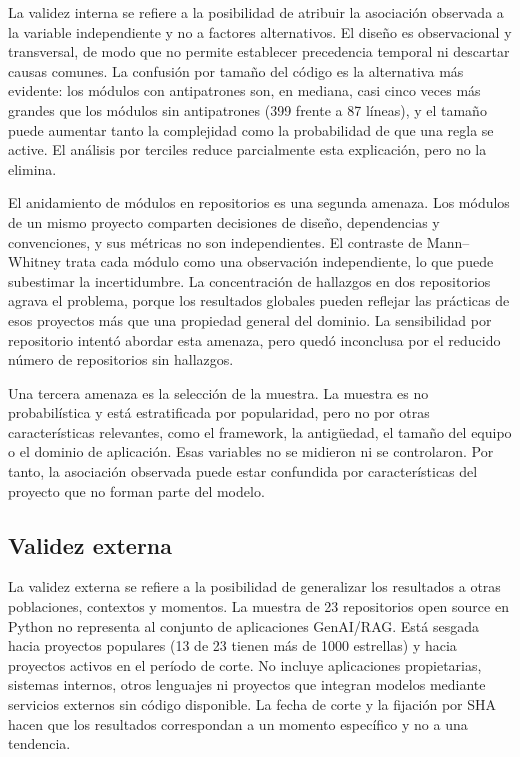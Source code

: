 La validez interna se refiere a la posibilidad de atribuir la asociación observada a la variable independiente y no a factores alternativos. El diseño es observacional y transversal, de modo que no permite establecer precedencia temporal ni descartar causas comunes. La confusión por tamaño del código es la alternativa más evidente: los módulos con antipatrones son, en mediana, casi cinco veces más grandes que los módulos sin antipatrones (399 frente a 87 líneas), y el tamaño puede aumentar tanto la complejidad como la probabilidad de que una regla se active. El análisis por terciles reduce parcialmente esta explicación, pero no la elimina.

El anidamiento de módulos en repositorios es una segunda amenaza. Los módulos de un mismo proyecto comparten decisiones de diseño, dependencias y convenciones, y sus métricas no son independientes. El contraste de Mann--Whitney trata cada módulo como una observación independiente, lo que puede subestimar la incertidumbre. La concentración de hallazgos en dos repositorios agrava el problema, porque los resultados globales pueden reflejar las prácticas de esos proyectos más que una propiedad general del dominio. La sensibilidad por repositorio intentó abordar esta amenaza, pero quedó inconclusa por el reducido número de repositorios sin hallazgos.

Una tercera amenaza es la selección de la muestra. La muestra es no probabilística y está estratificada por popularidad, pero no por otras características relevantes, como el framework, la antigüedad, el tamaño del equipo o el dominio de aplicación. Esas variables no se midieron ni se controlaron. Por tanto, la asociación observada puede estar confundida por características del proyecto que no forman parte del modelo.

\subsection{Validez externa}

La validez externa se refiere a la posibilidad de generalizar los resultados a otras poblaciones, contextos y momentos. La muestra de 23 repositorios open source en Python no representa al conjunto de aplicaciones GenAI/RAG. Está sesgada hacia proyectos populares (13 de 23 tienen más de 1000 estrellas) y hacia proyectos activos en el período de corte. No incluye aplicaciones propietarias, sistemas internos, otros lenguajes ni proyectos que integran modelos mediante servicios externos sin código disponible. La fecha de corte y la fijación por SHA hacen que los resultados correspondan a un momento específico y no a una tendencia.


